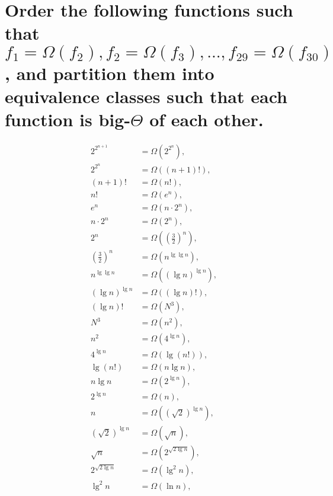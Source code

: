 \section[Problem 6]{Order the following functions such that $f_1 = \Omega(f_2), f_2 = \Omega(f_3), ..., f_{29} = \Omega(f_{30})$, and partition them into equivalence classes such that each function is big-$\Theta$ of each other.}

\begin{align*}
	2^{2^{n + 1}} &= \Omega \left(2^{2^n} \right), \\
	2^{2^n} &= \Omega \left((n + 1)! \right), \\
	(n + 1)! &= \Omega \left(n! \right), \\
	n! &= \Omega \left(e^n \right), \\
	e^n &= \Omega \left(n \cdot 2^n \right), \\
	n \cdot 2^n &= \Omega \left(2^n \right), \\
	2^n &= \Omega \left(\left( \frac{3}{2} \right)^n \right), \\
	\left( \frac{3}{2} \right)^n &= \Omega \left(n^{\lg \lg n} \right), \\
	n^{\lg \lg n} &= \Omega \left(\left( \lg n \right)^{\lg n} \right), \\
	\left( \lg n \right)^{\lg n} &= \Omega \left((\lg n)! \right), \\
	(\lg n)! &= \Omega \left(N^3 \right), \\
	N^3 &= \Omega \left(n^2 \right), \\
	n^2 &= \Omega \left(4^{\lg n} \right), \\
	4^{\lg n} &= \Omega \left(\lg (n!) \right), \\
	\lg (n!)  &= \Omega \left(n \lg n \right), \\
	n \lg n &= \Omega \left(2^{\lg n} \right), \\
	2^{\lg n} &= \Omega \left(n \right), \\
	n &= \Omega \left(\left( \sqrt{2} \right)^{\lg n} \right), \\
	\left( \sqrt{2} \right)^{\lg n} &= \Omega \left(\sqrt{n} \right), \\
	\sqrt{n} &= \Omega \left(2^{\sqrt{2 \lg n}} \right), \\
	2^{\sqrt{2 \lg n}} &= \Omega \left(\lg ^2 n \right), \\
	\lg ^2 n &= \Omega \left(\ln n \right), \\

\end{align*}
